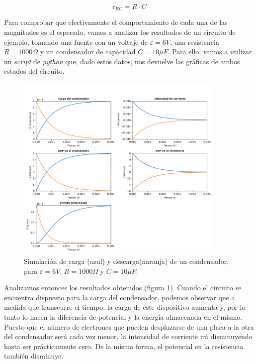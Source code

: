 \documentclass[../main.tex]{subfiles}
\begin{document}
\begin{equation}
    \tau_{RC} = R \cdot C
    \label{eqq::constante_tiempo_rc}
\end{equation}

Para comprobar que efectivamente el comportamiento de cada una de las magnitudes es el esperado, vamos a analizar los resultados de un circuito de ejemplo, tomando una fuente con un voltaje de $\varepsilon = 6V$, una resistencia $R=1000\Omega$ y un condensador de capacidad $C=10 \mu F$. Para ello, vamos a utilizar un \textit{script} de \textit{python} que, dado estos datos, nos devuelve las gráficas de ambos estados del circuito. 

\begin{figure}[!h]
    \centering
    \includegraphics[width=0.9\textwidth]{images/resultados_ejemplo_circuitoRC.png}
    \caption{Simulación de carga (azul) y descarga(naranja) de un condensador, para $\varepsilon=6V$, $R=1000 \Omega$ y $C=10 \mu F$.}
    \label{fig::sim_ejemplo_rc}
\end{figure}

Analizamos entonces los resultados obtenidos (figura \ref{fig::sim_ejemplo_rc}). Cuando el circuito se encuentra dispuesto para la carga del condensador, podemos observar que a medida que transcurre el tiempo, la carga de este dispositivo aumenta y, por lo tanto lo hacen la diferencia de potencial y la energía almacenada en el mismo. Puesto que el número de electrones que pueden desplazarse de una placa a la otra del condensador será cada vez menor, la intensidad de corriente irá disminuyendo hasta ser prácticamente cero. De la misma forma, el potencial en la resistencia también disminuye. 
\end{document}
